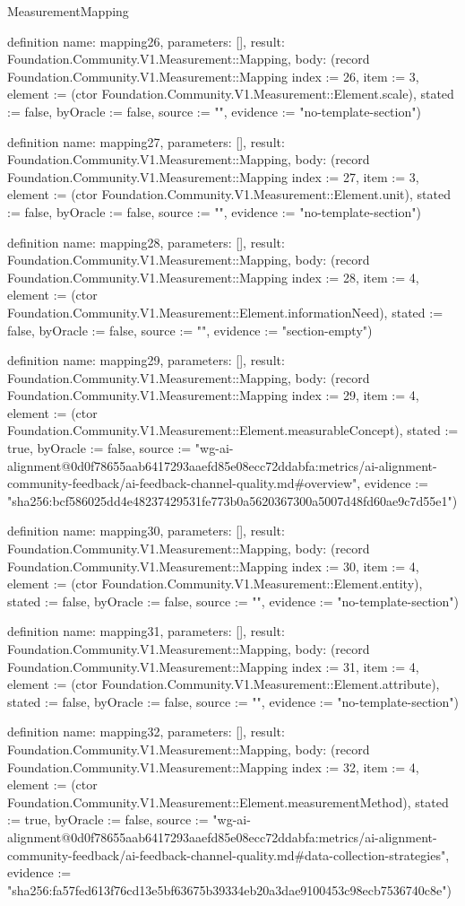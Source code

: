 \begin{lexlean}{MeasurementMapping}
\begin{semanticmodule}
definition{
  name: mapping26,
  parameters: [],
  result: Foundation.Community.V1.Measurement::Mapping,
  body: (record Foundation.Community.V1.Measurement::Mapping {index := 26, item := 3, element := (ctor Foundation.Community.V1.Measurement::Element.scale), stated := false, byOracle := false, source := "", evidence := "no-template-section"})
}

definition{
  name: mapping27,
  parameters: [],
  result: Foundation.Community.V1.Measurement::Mapping,
  body: (record Foundation.Community.V1.Measurement::Mapping {index := 27, item := 3, element := (ctor Foundation.Community.V1.Measurement::Element.unit), stated := false, byOracle := false, source := "", evidence := "no-template-section"})
}

definition{
  name: mapping28,
  parameters: [],
  result: Foundation.Community.V1.Measurement::Mapping,
  body: (record Foundation.Community.V1.Measurement::Mapping {index := 28, item := 4, element := (ctor Foundation.Community.V1.Measurement::Element.informationNeed), stated := false, byOracle := false, source := "", evidence := "section-empty"})
}

definition{
  name: mapping29,
  parameters: [],
  result: Foundation.Community.V1.Measurement::Mapping,
  body: (record Foundation.Community.V1.Measurement::Mapping {index := 29, item := 4, element := (ctor Foundation.Community.V1.Measurement::Element.measurableConcept), stated := true, byOracle := false, source := "wg-ai-alignment@0d0f78655aab6417293aaefd85e08ecc72ddabfa:metrics/ai-alignment-community-feedback/ai-feedback-channel-quality.md#overview", evidence := "sha256:bcf586025dd4e48237429531fe773b0a5620367300a5007d48fd60ae9c7d55e1"})
}

definition{
  name: mapping30,
  parameters: [],
  result: Foundation.Community.V1.Measurement::Mapping,
  body: (record Foundation.Community.V1.Measurement::Mapping {index := 30, item := 4, element := (ctor Foundation.Community.V1.Measurement::Element.entity), stated := false, byOracle := false, source := "", evidence := "no-template-section"})
}

definition{
  name: mapping31,
  parameters: [],
  result: Foundation.Community.V1.Measurement::Mapping,
  body: (record Foundation.Community.V1.Measurement::Mapping {index := 31, item := 4, element := (ctor Foundation.Community.V1.Measurement::Element.attribute), stated := false, byOracle := false, source := "", evidence := "no-template-section"})
}

definition{
  name: mapping32,
  parameters: [],
  result: Foundation.Community.V1.Measurement::Mapping,
  body: (record Foundation.Community.V1.Measurement::Mapping {index := 32, item := 4, element := (ctor Foundation.Community.V1.Measurement::Element.measurementMethod), stated := true, byOracle := false, source := "wg-ai-alignment@0d0f78655aab6417293aaefd85e08ecc72ddabfa:metrics/ai-alignment-community-feedback/ai-feedback-channel-quality.md#data-collection-strategies", evidence := "sha256:fa57fed613f76cd13e5bf63675b39334eb20a3dae9100453c98ecb7536740c8e"})
}


\end{semanticmodule}
\end{lexlean}
